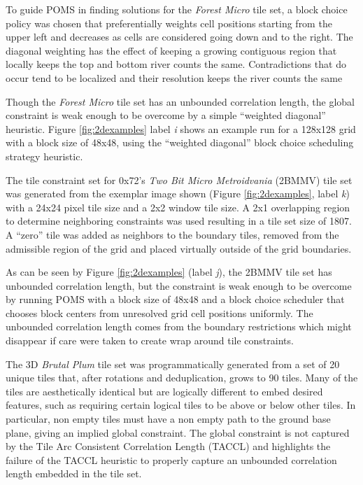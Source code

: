 To guide POMS in finding solutions for the \textit{Forest Micro} tile set, a
block choice policy was chosen that preferentially weights cell positions starting from the upper left and decreases as
cells are considered going down and to the right.
The diagonal weighting has the effect of keeping a growing contiguous region that locally keeps the top and bottom
river counts the same.
Contradictions that do occur tend to be localized and their resolution keeps the river counts the same

Though the \textit{Forest Micro} tile set has an unbounded correlation length, the global constraint is weak enough
to be overcome by a simple ``weighted diagonal'' heuristic.
Figure \ref{fig:2dexamples} label \textit{i} shows an example run for a 128x128 grid with a block size of 48x48, using
the ``weighted diagonal'' block choice scheduling strategy heuristic.

The tile constraint set for 0x72's \textit{Two Bit Micro Metroidvania} (2BMMV) tile set was
generated from the exemplar image shown (Figure \ref{fig:2dexamples}, label \textit{k}) with a 24x24 pixel tile size and a 2x2 window tile size.
A 2x1 overlapping region to determine neighboring constraints was used resulting in a tile set size of 1807.
A ``zero'' tile was added as neighbors to the boundary tiles, removed from
the admissible region of the grid and placed virtually outside of the grid boundaries.

As can be seen by Figure \ref{fig:2dexamples} (label \textit{j}), the 2BMMV tile set has unbounded correlation length, but the constraint is weak
enough to be overcome by running POMS with a block size of 48x48 and a block choice scheduler that chooses block centers from
unresolved grid cell positions uniformly.
The unbounded correlation length comes from the boundary restrictions which might disappear if care were taken
to create wrap around tile constraints.


The 3D \textit{Brutal Plum} tile set was programmatically generated from a set of 20 unique tiles that, after rotations and deduplication,
grows to 90 tiles.
Many of the tiles are aesthetically identical but are logically different to embed desired features, such as requiring certain
logical tiles to be above or below other tiles. %
In particular, non empty tiles must have a non empty path to the ground base plane, giving an implied global constraint.
The global constraint is not captured by the Tile Arc Consistent Correlation Length (TACCL) and highlights
the failure of the TACCL heuristic to properly capture an unbounded correlation length embedded in the tile set.

